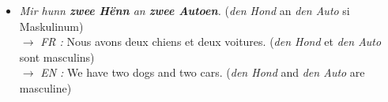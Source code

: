 \begin{itemize}
\begin{enumerate}
\begin{itemize}
            $\rightarrow$ \textit{FR :} J'ai deux filles. (Attention : \textit{d'Meedchen} étant neutre en raison du suffixe diminutif \textit{-chen}, on dit \textbf{zwee Meedercher}, et non pas \textit{*zwou Meedercher} !) \\
            $\rightarrow$ \textit{EN :} I have two girls. (Note: Because \textit{d'Meedchen} is neuter due to the diminutive suffix \textit{-chen}, one says \textbf{zwee Meedercher}, not \textit{*zwou Meedercher}!)
            \item \textit{Mir hunn \textbf{zwee Hënn} an \textbf{zwee Autoen}.} (\textit{den Hond} an \textit{den Auto} si Maskulinum) \\
            $\rightarrow$ \textit{FR :} Nous avons deux chiens et deux voitures. (\textit{den Hond} et \textit{den Auto} sont masculins) \\
            $\rightarrow$ \textit{EN :} We have two dogs and two cars. (\textit{den Hond} and \textit{den Auto} are masculine)
        \end{itemize}

        \vspace{0.3em}


\end{enumerate}
\end{itemize}
